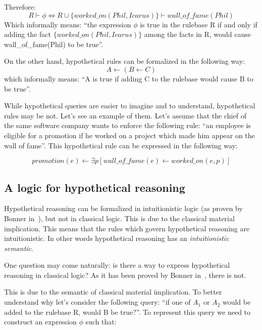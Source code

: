 Therefore:
\begin{equation}
  R \vdash \phi \iff R \cup \{worked\_on(Phil, Icarus)\} \vdash wall\_of\_fame(Phil)
\end{equation}
Which informally means: ``the expression $\phi$ is true in the rulebase R if and only if
adding the fact $\{worked\_on(Phil, Icarus)\}$ among the facts in R, would cause wall\_of\_fame(Phil)
to be true''.

On the other hand, hypothetical rules can be formalized in the following way:
\begin{equation}
  A \leftarrow (B \leftarrow C)
\end{equation}
which informally means: ``A is true if adding C to the rulebase would cause B to be true''.

While hypothetical queries are easier to imagine and to understand, hypothetical rules may be not. 
Let's see an example of them. Let's assume that the chief of the same software company
wants to enforce the following rule: ``an employee is eligible for a promotion if
he worked on a project which made him appear on the wall of fame''. This
hypothetical rule can be expressed in the following way:

\begin{equation}
  promotion(e) \leftarrow \exists p [wall\_of\_fame(e) \leftarrow worked\_on(e, p)]
\end{equation}

\subsection{A logic for hypothetical reasoning}
\label{sec:alfhr}
Hypothetical reasoning can be formalized in intuitionistic logic (as proven by
Bonner in~\cite{Bonner88alogic}), but not in classical logic. This is due to the
classical material implication. This means that the rules which govern hypothetical
reasoning are intuitionistic. In other words hypothetical reasoning has an
\textit{intuitionistic semantic}.

One question may come naturally: is there
a way to express hypothetical reasoning in classical logic?
As it has been proved by Bonner in~\cite{Bonner88alogic}, there is not.

This is due to the semantic of classical material implication. To better understand why
let's consider the following query:
``if one of $A_1$ or $A_2$ would be added
to the rulebase R, would B be true?''. To represent this query we need to construct
an expression $\phi$ such that:

